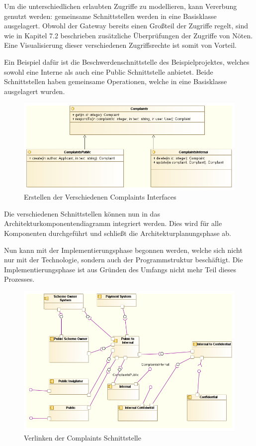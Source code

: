 Um die unterschiedlichen erlaubten Zugriffe zu modellieren, kann Vererbung genutzt werden: gemeinsame Schnittstellen werden in eine Basisklasse ausgelagert. Obwohl der Gateway bereits einen Großteil der Zugriffe regelt, sind wie in Kapitel 7.2 beschrieben zusätzliche Überprüfungen der Zugriffe von Nöten. Eine Visualisierung dieser verschiedenen Zugriffsrechte ist somit von Vorteil.

Ein Beispiel dafür ist die Beschwerdenschnittstelle des Beispielprojektes, welches sowohl eine Interne als auch eine Public Schnittstelle anbietet. Beide Schnittstellen haben gemeinsame Operationen, welche in eine Basisklasse ausgelagert wurden.

\begin{figure}[H]
    \centering
    \includegraphics[scale=0.6]{uml/complaintsinterface.png}
    \caption{Erstellen der Verschiedenen Complaints Interfaces}
\end{figure}

Die verschiedenen Schnittstellen können nun in das Architekturkomponentendiagramm integriert werden. Dies wird für alle Komponenten durchgeführt und schließt die Architekturplanungsphase ab.

Nun kann mit der Implementierungsphase begonnen werden, welche sich nicht nur mit der Technologie, sondern auch der Programmstruktur beschäftigt. Die Implementierungsphase ist aus Gründen des Umfangs nicht mehr Teil dieses Prozesses.

\begin{figure}[H]
    \centering
    \includegraphics[scale=0.6]{uml/v5.png}
    \caption{Verlinken der Complaints Schnittstelle}
\end{figure}